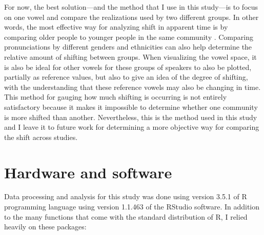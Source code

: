 For now, the best solution---and the method that I use in this study---is to focus on one vowel and compare the realizations used by two different groups. In other words, the most effective way for analyzing shift in apparent time is by comparing older people to younger people in the same community \citep{boberg_2005, cardoso_etal_2016_pads, holland_brandenburg_2017_pads, hall_lew_etal_2017}. Comparing pronunciations by different genders and ethnicities \citep{brumbaugh_koops_2017_pads} can also help determine the relative amount of shifting between groups. When visualizing the vowel space, it is also be ideal for other vowels for these groups of speakers to also be plotted, partially as reference values, but also to give an idea of the degree of shifting, with the understanding that these reference vowels may also be changing in time. This method for gauging how much shifting is occurring is not entirely satisfactory because it makes it impossible to determine whether one community is more shifted than another. Nevertheless, this is the method used in this study and I leave it to future work for determining a more objective way for comparing the shift across studies.

\section{Hardware and software}
\label{r_packages}

Data processing and analysis for this study was done using version 3.5.1 of R programming language \citep{r_2018} using version 1.1.463 of the RStudio software. In addition to the many functions that come with the standard distribution of R, I relied heavily on these packages:

